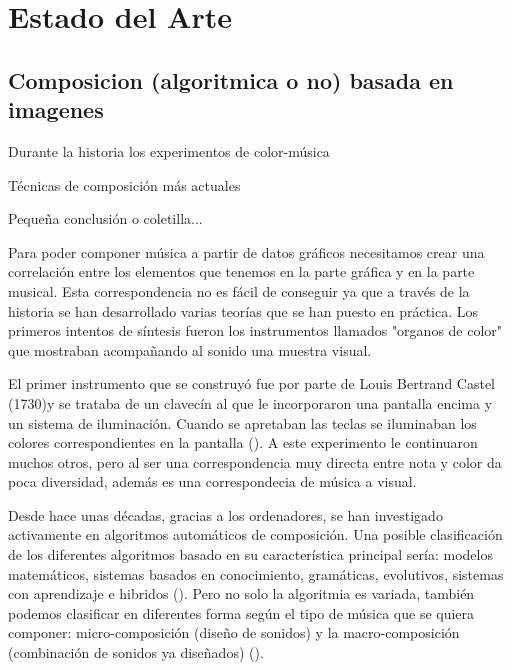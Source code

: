 ﻿\section{Estado del Arte}
\label{sec:estadodelarte}



\subsection{Composicion (algoritmica o no) basada en imagenes}


\begin{itimize}
\item Durante la historia los experimentos de color-música
\item Técnicas de composición más actuales
\item Pequeña conclusión o coletilla...
\end{itimize}

Para poder componer música a partir de datos gráficos necesitamos crear una correlación entre los elementos que tenemos en la parte gráfica y en la parte musical. Esta correspondencia no es fácil de conseguir ya que a través de la historia se han desarrollado varias teorías que se han puesto en práctica. Los primeros intentos de síntesis fueron los instrumentos llamados "organos de color" que mostraban acompañando al sonido una muestra visual.

El primer instrumento que se construyó fue por parte de Louis Bertrand Castel (1730)y se trataba de un clavecín al que le incorporaron una pantalla encima y un sistema de iluminación. Cuando se apretaban las teclas se iluminaban los colores correspondientes en la pantalla (\cite{OrganosColor}). A este experimento le continuaron muchos otros, pero al ser una correspondencia muy directa entre nota y color da poca diversidad, además es una correspondecia de música a visual.

Desde hace unas décadas, gracias a los ordenadores, se han investigado activamente en algoritmos automáticos de composición. Una posible clasificación de los diferentes algoritmos basado en su característica principal sería: modelos matemáticos, sistemas basados en conocimiento, gramáticas, evolutivos, sistemas con aprendizaje e hibridos (\cite{AIMethodsForComposition}). Pero no solo la algoritmia es variada, también podemos clasificar en diferentes forma según el tipo de música que se quiera componer: micro-composición (diseño de sonidos) y la macro-composición (combinación de sonidos ya diseñados) (\cite{AudioVisualSurvey}).

